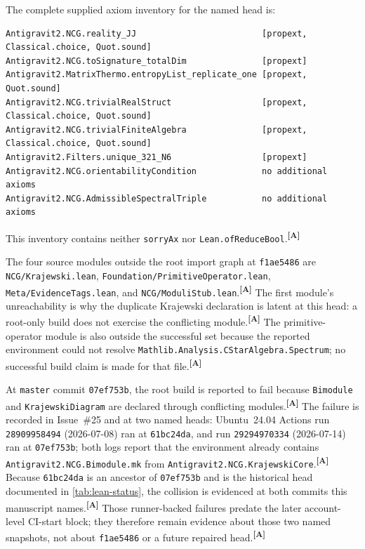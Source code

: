 \documentclass[12pt,a4paper,twoside]{article}
\theoremstyle{plain}
\theoremstyle{definition}
\theoremstyle{remark}
\newcommand{\catmark}[1]{\textsuperscript{\textsf{\textbf{[#1]}}}}
\begin{document}
The complete supplied axiom inventory for the named head is:
\begin{lstlisting}[basicstyle=\ttfamily\scriptsize,breaklines=true,columns=fullflexible]
Antigravit2.NCG.reality_JJ                         [propext, Classical.choice, Quot.sound]
Antigravit2.NCG.toSignature_totalDim               [propext]
Antigravit2.MatrixThermo.entropyList_replicate_one [propext, Quot.sound]
Antigravit2.NCG.trivialRealStruct                  [propext, Classical.choice, Quot.sound]
Antigravit2.NCG.trivialFiniteAlgebra               [propext, Classical.choice, Quot.sound]
Antigravit2.Filters.unique_321_N6                  [propext]
Antigravit2.NCG.orientabilityCondition             no additional axioms
Antigravit2.NCG.AdmissibleSpectralTriple           no additional axioms
\end{lstlisting}
This inventory contains neither \texttt{sorryAx} nor
\texttt{Lean.ofReduceBool}.\catmark{A}

\begin{governancebox}
The four source modules outside the root import graph at
\texttt{f1ae5486} are \texttt{NCG/Krajewski.lean},
\texttt{Foundation/PrimitiveOperator.lean},
\texttt{Meta/EvidenceTags.lean}, and \texttt{NCG/ModuliStub.lean}.\catmark{A}
The first module's unreachability is why the duplicate Krajewski declaration
is latent at this head: a root-only build does not exercise the conflicting
module.\catmark{A}
The primitive-operator module is also outside the successful set because the
reported environment could not resolve
\texttt{Mathlib.Analysis.CStarAlgebra.Spectrum}; no successful build claim is
made for that file.\catmark{A}
\end{governancebox}

\begin{governancebox}
At \texttt{master} commit \texttt{07ef753b}, the root build is reported to
fail because \texttt{Bimodule} and \texttt{KrajewskiDiagram} are declared
through conflicting modules.\catmark{A}
The failure is recorded in Issue~\#25 and at two named heads: Ubuntu~24.04
Actions run \texttt{28909958494} (2026-07-08) ran at \texttt{61bc24da}, and
run \texttt{29294970334} (2026-07-14) ran at \texttt{07ef753b}; both logs
report that the environment already contains
\texttt{Antigravit2.NCG.Bimodule.mk} from
\texttt{Antigravit2.NCG.KrajewskiCore}.\catmark{A}
Because \texttt{61bc24da} is an ancestor of \texttt{07ef753b} and is the
historical head documented in \cref{tab:lean-status}, the collision is
evidenced at both commits this manuscript names.\catmark{A}
Those runner-backed failures predate the later account-level CI-start block;
they therefore remain evidence about those two named snapshots,
not about \texttt{f1ae5486} or a future repaired head.\catmark{A}
\end{governancebox}
\end{document}
